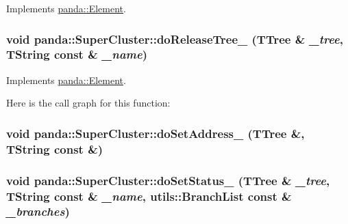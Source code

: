 Implements \hyperlink{classpanda_1_1Element_a374af043de4cf724fb6f640644ec35dc}{panda::Element}.\hypertarget{classpanda_1_1SuperCluster_ac09c224f056ac15319802ccb3a807a2a}{
\subsubsection[{doReleaseTree\_\-}]{\setlength{\rightskip}{0pt plus 5cm}void panda::SuperCluster::doReleaseTree\_\- (TTree \& {\em \_\-tree}, \/  TString const \& {\em \_\-name})}}
\label{classpanda_1_1SuperCluster_ac09c224f056ac15319802ccb3a807a2a}


Implements \hyperlink{classpanda_1_1Element_a7ae1dd245caf18525c891d3d2f9323d5}{panda::Element}.

Here is the call graph for this function:\hypertarget{classpanda_1_1SuperCluster_a70ea0eea33b735c6c38414ffaa3e1f15}{
\subsubsection[{doSetAddress\_\-}]{\setlength{\rightskip}{0pt plus 5cm}void panda::SuperCluster::doSetAddress\_\- (TTree \&, \/  TString const \&)}}
\label{classpanda_1_1SuperCluster_a70ea0eea33b735c6c38414ffaa3e1f15}
\hypertarget{classpanda_1_1SuperCluster_ac76b8e67d9f4c276c4cf97a563ef5627}{
\subsubsection[{doSetStatus\_\-}]{\setlength{\rightskip}{0pt plus 5cm}void panda::SuperCluster::doSetStatus\_\- (TTree \& {\em \_\-tree}, \/  TString const \& {\em \_\-name}, \/  {\bf utils::BranchList} const \& {\em \_\-branches})}}
\label{classpanda_1_1SuperCluster_ac76b8e67d9f4c276c4cf97a563ef5627}


